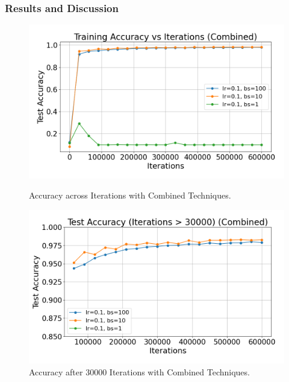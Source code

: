 \subsubsection{Results and Discussion}

\begin{figure}[h]
    \centering
    \begin{minipage}[b]{0.45\textwidth}
        \centering
        \includegraphics[width=\linewidth]{../data/part2/combined/accuracy_training_plot_combined}
        \caption{Accuracy across Iterations with Combined Techniques.}
        \label{fig:training_combined}
    \end{minipage}
    \hfill
    \begin{minipage}[b]{0.45\textwidth}
        \centering
        \includegraphics[width=\linewidth]{../data/part2/combined/accuracy_training_plot_combined_post_30000}
        \caption{Accuracy after 30000 Iterations with Combined Techniques.}
        \label{fig:30000_combined}
    \end{minipage}
\end{figure}

